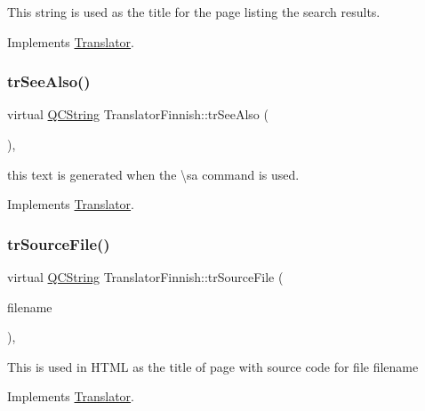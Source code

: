 This string is used as the title for the page listing the search results. 

Implements \mbox{\hyperlink{class_translator}{Translator}}.

\mbox{\label{class_translator_finnish_ac6ecd6d16ebee6f2ef2af7f05ace6c0b}} 
\subsubsection{\texorpdfstring{trSeeAlso()}{trSeeAlso()}}
{\footnotesize\ttfamily virtual \mbox{\hyperlink{class_q_c_string}{Q\+C\+String}} Translator\+Finnish\+::tr\+See\+Also (\begin{DoxyParamCaption}{ }\end{DoxyParamCaption})\hspace{0.3cm}{\ttfamily [inline]}, {\ttfamily [virtual]}}

this text is generated when the \textbackslash{}sa command is used. 

Implements \mbox{\hyperlink{class_translator}{Translator}}.

\mbox{\label{class_translator_finnish_a1b5d540931453bdd6978ebf1ecc5481d}} 
\subsubsection{\texorpdfstring{trSourceFile()}{trSourceFile()}}
{\footnotesize\ttfamily virtual \mbox{\hyperlink{class_q_c_string}{Q\+C\+String}} Translator\+Finnish\+::tr\+Source\+File (\begin{DoxyParamCaption}\item[{\mbox{\hyperlink{class_q_c_string}{Q\+C\+String}} \&}]{filename }\end{DoxyParamCaption})\hspace{0.3cm}{\ttfamily [inline]}, {\ttfamily [virtual]}}

This is used in H\+T\+ML as the title of page with source code for file filename 

Implements \mbox{\hyperlink{class_translator}{Translator}}.

\mbox{\label{class_translator_finnish_a8634c0308b908dc242240d341a7addad}} 
